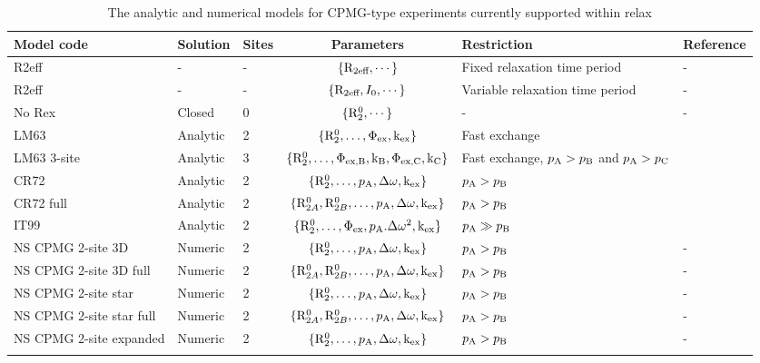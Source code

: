 \begin{table}
\begin{center}
\caption{The analytic and numerical models for CPMG-type experiments currently supported within relax}
\begin{tabular}{lllcll}
\toprule
Model code               & Solution & Sites & Parameters                                          & Restriction                       & Reference \\
\midrule                                    
R2eff                    & -        & -     & $\{\mathrm{R}_{2\textrm{eff}}, \cdots\}$                              & Fixed relaxation time period      & - \\
R2eff                    & -        & -     & $\{\mathrm{R}_{2\textrm{eff}}, I_0, \cdots\}$                         & Variable relaxation time period   & - \\
No Rex                   & Closed   & 0     & $\{\mathrm{R}_2^0, \cdots\}$                             & -                                 & - \\
LM63                     & Analytic & 2     & $\{\mathrm{R}_2^0, \dots, \Phi_\textrm{ex}, \textrm{k}_\textrm{ex}\}$                & Fast exchange                     & \citet{LuzMeiboom63} \\
LM63 3-site              & Analytic & 3     & $\{\mathrm{R}_2^0, \dots, \Phi_\textrm{ex,B}, \textrm{k}_\textrm{B}, \Phi_\textrm{ex,C}, \textrm{k}_\textrm{C}\}$  & Fast exchange, $p_\textrm{A} > p_\textrm{B}$ and $p_\textrm{A} > p_\textrm{C}$  & \citet{LuzMeiboom63} \\
CR72                     & Analytic & 2     & $\{\mathrm{R}_2^0, \dots, p_\textrm{A}, \Delta\omega, \textrm{k}_\textrm{ex}\}$              & $p_\textrm{A} > p_\textrm{B}$                       & \citet{CarverRichards72} \\
CR72 full                & Analytic & 2     & $\{\mathrm{R}_{2A}^0, \mathrm{R}_{2B}^0, \dots, p_\textrm{A}, \Delta\omega, \textrm{k}_\textrm{ex}\}$ & $p_\textrm{A} > p_\textrm{B}$                       & \citet{CarverRichards72} \\
IT99                     & Analytic & 2     & $\{\mathrm{R}_2^0, \dots, \Phi_\textrm{ex}, p_\textrm{A}.\Delta\omega^2, \textrm{k}_\textrm{ex}\}$     & $p_\textrm{A} \gg p_\textrm{B}$                     & \citet{IshimaTorchia99} \\
NS CPMG 2-site 3D        & Numeric  & 2     & $\{\mathrm{R}_2^0, \dots, p_\textrm{A}, \Delta\omega, \textrm{k}_\textrm{ex}\}$              & $p_\textrm{A} > p_\textrm{B}$                       & - \\
NS CPMG 2-site 3D full   & Numeric  & 2     & $\{\mathrm{R}_{2A}^0, \mathrm{R}_{2B}^0, \dots, p_\textrm{A}, \Delta\omega, \textrm{k}_\textrm{ex}\}$ & $p_\textrm{A} > p_\textrm{B}$                       & - \\
NS CPMG 2-site star      & Numeric  & 2     & $\{\mathrm{R}_2^0, \dots, p_\textrm{A}, \Delta\omega, \textrm{k}_\textrm{ex}\}$              & $p_\textrm{A} > p_\textrm{B}$                       & - \\
NS CPMG 2-site star full & Numeric  & 2     & $\{\mathrm{R}_{2A}^0, \mathrm{R}_{2B}^0, \dots, p_\textrm{A}, \Delta\omega, \textrm{k}_\textrm{ex}\}$ & $p_\textrm{A} > p_\textrm{B}$                       & - \\
NS CPMG 2-site expanded  & Numeric  & 2     & $\{\mathrm{R}_2^0, \dots, p_\textrm{A}, \Delta\omega, \textrm{k}_\textrm{ex}\}$              & $p_\textrm{A} > p_\textrm{B}$                       & - \\
\bottomrule
\label{table: CPMG dispersion models}
\end{tabular}
\end{center}
\end{table}



